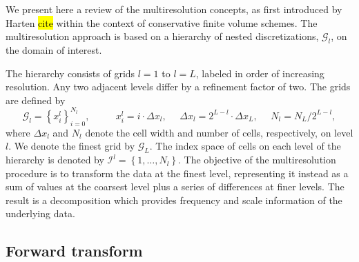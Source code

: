 \documentclass[]{article}
\begin{document}
    We present here a review of the multiresolution concepts, as first
    introduced by Harten \hl{cite} within the context of conservative finite
    volume schemes. The multiresolution approach is based on a hierarchy of
    nested discretizations, $\bm{\mathcal{G}}_{l}$, on the domain of interest.

    The hierarchy consists of grids $l=1$ to $l=L$, labeled in order of
    increasing resolution. Any two adjacent levels differ by a refinement factor
    of two.  The grids are defined by
    \begin{equation}
        \bm{\mathcal{G}}_{l} = \left\{ x_{i}^{l} \right\}_{i=0}^{N_{l}}, \text{ }
        \text{ } \text{ } \text{ } x_{i}^{l} = i \cdot \Delta x_{l}, \text{ }
        \text{ } \Delta x_{l} = 2^{L-l} \cdot \Delta x_{L}, \text{ } \text{ } N_{l} = N_{L}
        / 2^{L-l},
    \end{equation}
    where $\Delta x_{l}$ and $N_{l}$ denote the cell width and number of cells,
    respectively, on level $l$. We denote the finest grid by
    $\bm{\mathcal{G}}_{L}$. The index space of cells on each level of the
    hierarchy is denoted by $\bm{\mathcal{I}}^{l} = \left\{ 1,\dots,N_{l}
    \right\}$. The objective of the multiresolution procedure is to transform
    the data at the finest level, representing it instead as a sum of values at
    the coarsest level plus a series of differences at finer levels. The result
    is a decomposition which provides frequency and scale information of the
    underlying data.

    \subsection*{Forward transform}
\end{document}

